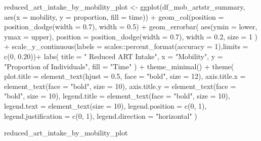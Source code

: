 \documentclass[
  letterpaper,
  DIV=11,
  numbers=noendperiod]{scrartcl}
\newenvironment{Shaded}{\begin{snugshade}}{\end{snugshade}}
\newcommand{\AttributeTok}[1]{\textcolor[rgb]{0.40,0.45,0.13}{#1}}
\newcommand{\DecValTok}[1]{\textcolor[rgb]{0.68,0.00,0.00}{#1}}
\newcommand{\FloatTok}[1]{\textcolor[rgb]{0.68,0.00,0.00}{#1}}
\newcommand{\FunctionTok}[1]{\textcolor[rgb]{0.28,0.35,0.67}{#1}}
\newcommand{\NormalTok}[1]{\textcolor[rgb]{0.00,0.23,0.31}{#1}}
\newcommand{\OtherTok}[1]{\textcolor[rgb]{0.00,0.23,0.31}{#1}}
\newcommand{\SpecialCharTok}[1]{\textcolor[rgb]{0.37,0.37,0.37}{#1}}
\newcommand{\StringTok}[1]{\textcolor[rgb]{0.13,0.47,0.30}{#1}}
\begin{document}
\begin{Shaded}
\begin{Highlighting}[]
\NormalTok{reduced\_art\_intake\_by\_mobility\_plot }\OtherTok{\textless{}{-}} \FunctionTok{ggplot}\NormalTok{(df\_mob\_artstr\_summary, }\FunctionTok{aes}\NormalTok{(}\AttributeTok{x =}\NormalTok{ mobility, }\AttributeTok{y =}\NormalTok{ proportion, }\AttributeTok{fill =}\NormalTok{ time)) }\SpecialCharTok{+}
  \FunctionTok{geom\_col}\NormalTok{(}\AttributeTok{position =} \FunctionTok{position\_dodge}\NormalTok{(}\AttributeTok{width =} \FloatTok{0.7}\NormalTok{), }\AttributeTok{width =} \FloatTok{0.5}\NormalTok{) }\SpecialCharTok{+}
  \FunctionTok{geom\_errorbar}\NormalTok{(}
    \FunctionTok{aes}\NormalTok{(}\AttributeTok{ymin =}\NormalTok{ lower, }\AttributeTok{ymax =}\NormalTok{ upper),}
    \AttributeTok{position =} \FunctionTok{position\_dodge}\NormalTok{(}\AttributeTok{width =} \FloatTok{0.7}\NormalTok{),}
    \AttributeTok{width =} \FloatTok{0.2}\NormalTok{,}
    \AttributeTok{size =} \DecValTok{1}
\NormalTok{  ) }\SpecialCharTok{+}
  \FunctionTok{scale\_y\_continuous}\NormalTok{(}\AttributeTok{labels =}\NormalTok{ scales}\SpecialCharTok{::}\FunctionTok{percent\_format}\NormalTok{(}\AttributeTok{accuracy =} \DecValTok{1}\NormalTok{),}\AttributeTok{limits =} \FunctionTok{c}\NormalTok{(}\DecValTok{0}\NormalTok{, }\FloatTok{0.20}\NormalTok{))}\SpecialCharTok{+}
  \FunctionTok{labs}\NormalTok{(}
    \AttributeTok{title =} \StringTok{" Reduced ART Intake"}\NormalTok{,}
    \AttributeTok{x =} \StringTok{"Mobility"}\NormalTok{,}
    \AttributeTok{y =} \StringTok{"Proportion of Individuals"}\NormalTok{,}
    \AttributeTok{fill =}  \StringTok{"Time"}
\NormalTok{  ) }\SpecialCharTok{+}
  \FunctionTok{theme\_minimal}\NormalTok{() }\SpecialCharTok{+}
  \FunctionTok{theme}\NormalTok{(}
    \AttributeTok{plot.title =} \FunctionTok{element\_text}\NormalTok{(}\AttributeTok{hjust =} \FloatTok{0.5}\NormalTok{, }\AttributeTok{face =} \StringTok{"bold"}\NormalTok{, }\AttributeTok{size =} \DecValTok{12}\NormalTok{),}
    \AttributeTok{axis.title.x =} \FunctionTok{element\_text}\NormalTok{(}\AttributeTok{face =} \StringTok{"bold"}\NormalTok{, }\AttributeTok{size =} \DecValTok{10}\NormalTok{),}
    \AttributeTok{axis.title.y =} \FunctionTok{element\_text}\NormalTok{(}\AttributeTok{face =} \StringTok{"bold"}\NormalTok{, }\AttributeTok{size =} \DecValTok{10}\NormalTok{),}
    \AttributeTok{legend.title =} \FunctionTok{element\_text}\NormalTok{(}\AttributeTok{face =} \StringTok{"bold"}\NormalTok{, }\AttributeTok{size =} \DecValTok{10}\NormalTok{),}
    \AttributeTok{legend.text =} \FunctionTok{element\_text}\NormalTok{(}\AttributeTok{size =} \DecValTok{10}\NormalTok{),}
    \AttributeTok{legend.position =} \FunctionTok{c}\NormalTok{(}\DecValTok{0}\NormalTok{, }\DecValTok{1}\NormalTok{),}
    \AttributeTok{legend.justification =} \FunctionTok{c}\NormalTok{(}\DecValTok{0}\NormalTok{, }\DecValTok{1}\NormalTok{),}
    \AttributeTok{legend.direction =} \StringTok{"horizontal"}
\NormalTok{  )}

\NormalTok{reduced\_art\_intake\_by\_mobility\_plot}
\end{Highlighting}
\end{Shaded}
\end{document}
